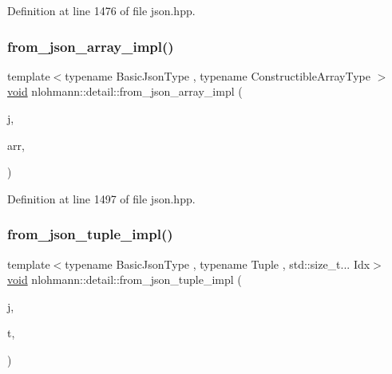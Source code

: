 Definition at line 1476 of file json.\+hpp.

\mbox{\label{namespacenlohmann_1_1detail_a20cf21255e75cff1ffb0869c2c545e63}} 
\subsubsection{\texorpdfstring{from\_json\_array\_impl()}{from\_json\_array\_impl()}\hspace{0.1cm}{\footnotesize\ttfamily [4/4]}}
{\footnotesize\ttfamily template$<$typename Basic\+Json\+Type , typename Constructible\+Array\+Type $>$ \\
\mbox{\hyperlink{namespacenlohmann_1_1detail_a59fca69799f6b9e366710cb9043aa77d}{void}} nlohmann\+::detail\+::from\+\_\+json\+\_\+array\+\_\+impl (\begin{DoxyParamCaption}\item[{const Basic\+Json\+Type \&}]{j,  }\item[{Constructible\+Array\+Type \&}]{arr,  }\item[{\mbox{\hyperlink{structnlohmann_1_1detail_1_1priority__tag}{priority\+\_\+tag}}$<$ 0 $>$}]{ }\end{DoxyParamCaption})}



Definition at line 1497 of file json.\+hpp.

\mbox{\label{namespacenlohmann_1_1detail_a28253915d9db4a0112d60eaee0422949}} 
\subsubsection{\texorpdfstring{from\_json\_tuple\_impl()}{from\_json\_tuple\_impl()}}
{\footnotesize\ttfamily template$<$typename Basic\+Json\+Type , typename Tuple , std\+::size\+\_\+t... Idx$>$ \\
\mbox{\hyperlink{namespacenlohmann_1_1detail_a59fca69799f6b9e366710cb9043aa77d}{void}} nlohmann\+::detail\+::from\+\_\+json\+\_\+tuple\+\_\+impl (\begin{DoxyParamCaption}\item[{const Basic\+Json\+Type \&}]{j,  }\item[{Tuple \&}]{t,  }\item[{\mbox{\hyperlink{structnlohmann_1_1detail_1_1index__sequence}{index\+\_\+sequence}}$<$ Idx... $>$}]{ }\end{DoxyParamCaption})}



